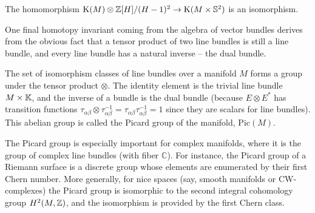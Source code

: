 \begin{thm}
    The homomorphism $\mathrm{K}(M)\otimes \mathbb{Z}[H]\slash(H-1)^2\to \mathrm{K}(M\times\mathbb{S}^2)$ is an isomorphism.
\end{thm}


One final homotopy invariant coming from the algebra of vector bundles derives from the obvious fact that a tensor product of two line bundles is still a line bundle, and every line bundle has a natural inverse -- the dual bundle.

\begin{defn}
    The set of isomorphism classes of line bundles over a manifold $M$ forms a group under the tensor product $\otimes$. The identity element is the trivial line bundle $M\times\mathbb{K} $, and the inverse of a bundle is the dual bundle (because $E\otimes E^\ast$ has transition functions $\tau_{\alpha\beta}\otimes \tau_{\alpha\beta}^{-1}=\tau_{\alpha\beta} \tau_{\alpha\beta}^{-1}=1$ since they are scalars for line bundles).
    This abelian group is called the Picard group of the manifold, $\mathrm{Pic}(M)$.
\end{defn}
\begin{rem}
    The Picard group is especially important for complex manifolds, where it is the group of complex line bundles (with fiber $\mathbb{C}$). For instance, the Picard group of a Riemann surface is a discrete group whose elements are enumerated by their first Chern number. More generally, for nice spaces (say, smooth manifolds or CW-complexes) the Picard group is isomorphic to the second integral cohomology group $H^2(M,\mathbb{Z})$, and the isomorphism is provided by the first Chern class.
\end{rem}






